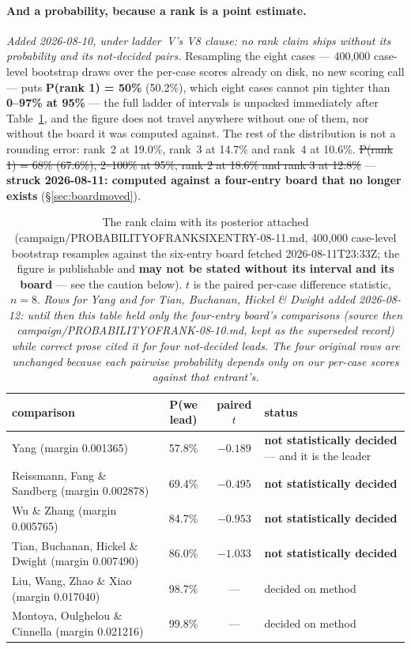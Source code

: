 \documentclass[11pt,a4paper]{article}
\newcommand{\breakus}{\textunderscore\allowbreak}
\newcommand{\artifact}[1]{{\footnotesize\ttfamily\let\_\breakus #1}}
\begin{document}
\paragraph{And a probability, because a rank is a point estimate.} \emph{Added 2026-08-10,
under ladder~V's V8 clause: no rank claim ships without its probability and its
not-decided pairs.} Resampling the eight cases --- 400{,}000 case-level bootstrap draws over
the per-case scores already on disk, no new scoring call --- puts
\textbf{P(rank 1) = 50\%} (50.2\%), which eight cases cannot pin tighter than
\textbf{0--97\% at 95\%} --- the full ladder of intervals is unpacked immediately after
Table~\ref{tab:prank}, and the figure does not travel anywhere without one of them, nor without
the board it was computed against. The rest of the distribution is not a rounding error:
rank~2 at 19.0\%, rank~3 at 14.7\% and rank~4 at 10.6\%.
\sout{P(rank 1) = 68\% (67.6\%), 2--100\% at 95\%, rank 2 at 18.6\% and rank 3 at 12.8\%}
--- \textbf{struck 2026-08-11: computed against a four-entry board that no longer exists}
(\S\ref{sec:boardmoved}).

\begin{table}[htbp]
\centering\footnotesize
\caption{The rank claim with its posterior attached (\artifact{campaign/PROBABILITY\_OF\_RANK\_SIX\_ENTRY\_2026-08-11.md},
400{,}000 case-level bootstrap resamples against the six-entry board fetched
2026-08-11T23:33Z; the figure is publishable and \textbf{may not be
stated without its interval and its board} --- see the caution below).
\(t\) is the paired per-case difference statistic, \(n=8\). \emph{Rows for Yang and for
Tian, Buchanan, Hickel \& Dwight added 2026-08-12: until then this table held only the
four-entry board's comparisons (source then
\artifact{campaign/PROBABILITY\_OF\_RANK\_2026-08-10.md}, kept as the superseded record)
while correct prose cited it for four not-decided leads. The four original rows are
unchanged because each pairwise probability depends only on our per-case scores against
that entrant's.}}
\label{tab:prank}
\begin{tabular}{@{}lccl@{}}
\toprule
comparison & P(we lead) & paired \(t\) & status \\
\midrule
Yang (margin 0.001365) & 57.8\% & \(-0.189\) & \textbf{not statistically decided} --- and it is the leader \\
Reissmann, Fang \& Sandberg (margin 0.002878) & 69.4\% & \(-0.495\) & \textbf{not statistically decided} \\
Wu \& Zhang (margin 0.005765) & 84.7\% & \(-0.953\) & \textbf{not statistically decided} \\
Tian, Buchanan, Hickel \& Dwight (margin 0.007490) & 86.0\% & \(-1.033\) & \textbf{not statistically decided} \\
Liu, Wang, Zhao \& Xiao (margin 0.017040) & 98.7\% & --- & decided on method \\
Montoya, Oulghelou \& Cinnella (margin 0.021216) & 99.8\% & --- & decided on method \\
\bottomrule
\end{tabular}
\end{table}
\end{document}
